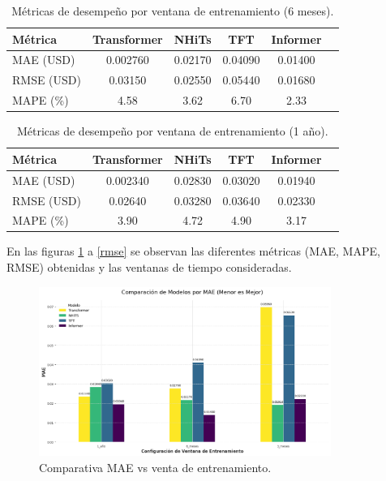 \documentclass[12pt]{article}
\begin{document}
\begin{table}[H]
\centering
\caption{Métricas de desempeño por ventana de entrenamiento (6 meses).}
\begin{tabular}{lccccc}
\toprule
\textbf{Métrica} & \textbf{Transformer} & \textbf{NHiTs} & \textbf{TFT} & \textbf{Informer} \\
\midrule
MAE (USD)  & 0.002760 & 0.02170 & 0.04090 & 0.01400 \\
RMSE (USD) & 0.03150 & 0.02550 & 0.05440 & 0.01680 \\
MAPE (\%)  & 4.58 & 3.62 & 6.70 & 2.33 \\
\bottomrule
\end{tabular}
\label{metricas_6_meses}
\end{table}


\begin{table}[H]
\centering
\caption{Métricas de desempeño por ventana de entrenamiento (1 año).}
\begin{tabular}{lccccc}
\toprule
\textbf{Métrica} & \textbf{Transformer} & \textbf{NHiTs} & \textbf{TFT} & \textbf{Informer} \\
\midrule
MAE (USD)  & 0.002340 & 0.02830 & 0.03020 & 0.01940 \\
RMSE (USD) & 0.02640 & 0.03280 & 0.03640 & 0.02330 \\
MAPE (\%)  & 3.90 & 4.72 & 4.90 & 3.17 \\
\bottomrule
\end{tabular}
\label{metricas_1_anio}
\end{table}


En las figuras \ref{mae} a \ref{rmse} se observan las diferentes métricas (MAE, MAPE, RMSE) obtenidas y las ventanas de tiempo consideradas.

\begin{figure}[H]
\centering
\includegraphics[width=0.85\textwidth]{../results/comparacion_modelos_por_MAE.png}
\caption{Comparativa MAE vs venta de entrenamiento.}
\label{mae}
\end{figure}
\end{document}
